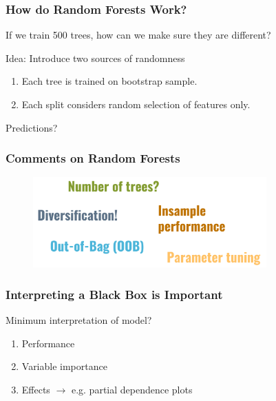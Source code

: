 \documentclass[
    utf8,
    aspectratio=169
]{beamer}  %
\begin{document}
\begin{frame}
	\frametitle{How do Random Forests Work?}
	If we train 500 trees, how can we make sure they are different? 
	
	\vfill
	
	\begin{block}{Idea: Introduce two sources of randomness}
		\begin{enumerate}
			\item Each tree is trained on bootstrap sample.
			\item Each split considers random selection of features only.
		\end{enumerate}
	\end{block}

	\vfill

	Predictions? 
\end{frame}

\begin{frame}
	\frametitle{Comments on Random Forests}
	\begin{figure}
		\includegraphics[width=0.8\textwidth]{pics/rf_words.png}
	\end{figure}
	\begin{example}
	\end{example}
\end{frame}

\begin{frame}
	\frametitle{Interpreting a Black Box is Important}
	\begin{block}{Minimum interpretation of model?}
		\begin{enumerate}
			\item Performance
			\item Variable importance
			\item Effects $\rightarrow$ e.g. partial dependence plots
		\end{enumerate}
	\end{block}

	\vfill
	
	\begin{example}
	\end{example}
\end{frame}
\end{document}
